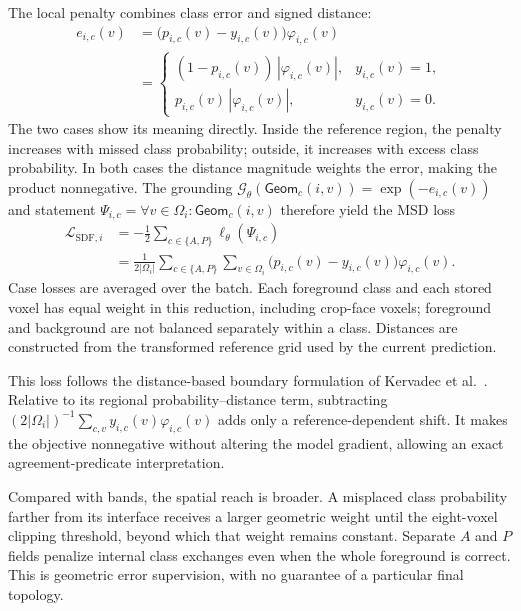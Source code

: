 \documentclass[12pt,a4paper]{article}
\begin{document}
The local penalty combines class error and signed distance:
\begin{equation}
\begin{aligned}
e_{i,c}(v)
&=\bigl(p_{i,c}(v)-y_{i,c}(v)\bigr)\varphi_{i,c}(v)\\
&=\begin{cases}
   (1-p_{i,c}(v))\,|\varphi_{i,c}(v)|, &y_{i,c}(v)=1,\\
   p_{i,c}(v)\,|\varphi_{i,c}(v)|, &y_{i,c}(v)=0.
  \end{cases}
\end{aligned}
\label{eq:sdf-local-violation}
\end{equation}
The two cases show its meaning directly. Inside the reference region,
the penalty increases with missed class probability; outside, it
increases with excess class probability. In both cases the distance
magnitude weights the error, making the product nonnegative.
The grounding
$\mathcal G_\theta(\mathsf{Geom}_c(i,v))=\exp(-e_{i,c}(v))$
and statement
$\Psi_{i,c}=\forall v\in\Omega_i:\mathsf{Geom}_c(i,v)$
therefore yield the MSD loss
\begin{equation}
\begin{aligned}
\mathcal{L}_{\mathrm{SDF},i}
&=-\frac12\sum_{c\in\{A,P\}}\ell_\theta(\Psi_{i,c})\\
&=\frac{1}{2|\Omega_i|}
  \sum_{c\in\{A,P\}}\sum_{v\in\Omega_i}
  \bigl(p_{i,c}(v)-y_{i,c}(v)\bigr)\varphi_{i,c}(v).
\end{aligned}
\label{eq:sdf-full-volume-loss}
\end{equation}
Case losses are averaged over the batch. Each foreground class and each
stored voxel has equal weight in this reduction, including crop-face
voxels; foreground and background are not balanced separately within
a class. Distances are constructed from the transformed reference grid
used by the current prediction.

This loss follows the distance-based boundary formulation of
Kervadec et al.\ \cite{kervadec2019boundary}. Relative to its regional
probability--distance term, subtracting
$(2|\Omega_i|)^{-1}\sum_{c,v}y_{i,c}(v)\varphi_{i,c}(v)$
adds only a reference-dependent shift. It makes the objective
nonnegative without altering the model gradient, allowing an exact
agreement-predicate interpretation.

Compared with bands, the spatial reach is broader. A misplaced class
probability farther from its interface receives a larger geometric
weight until the eight-voxel clipping threshold, beyond which that
weight remains constant. Separate $A$ and $P$ fields penalize internal
class exchanges even when the whole foreground is correct. This is
geometric error supervision, with no guarantee of a particular final
topology.
\end{document}
